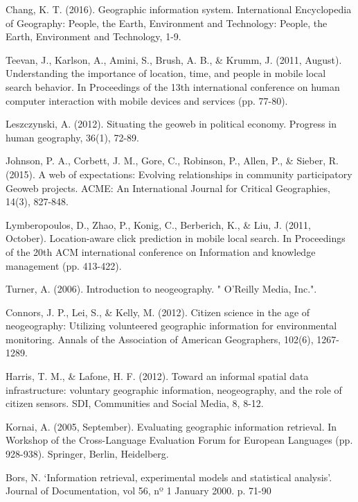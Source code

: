 \documentclass{llncs}
\begin{document}
%
%
\begin{thebibliography}{}
%
Chang, K. T. (2016). Geographic information system. International Encyclopedia
of Geography: People, the Earth, Environment and Technology: People, the Earth,
Environment and Technology, 1-9.

Teevan, J., Karlson, A., Amini, S., Brush, A. B., \& Krumm, J. (2011, August).
Understanding the importance of location, time, and people in mobile local
search behavior. In Proceedings of the 13th international conference on human
computer interaction with mobile devices and services (pp. 77-80).

Leszczynski, A. (2012). Situating the geoweb in political economy.
Progress in human geography, 36(1), 72-89.

Johnson, P. A., Corbett, J. M., Gore, C., Robinson, P., Allen, P., \& Sieber,
R. (2015). A web of expectations: Evolving relationships in community
participatory Geoweb projects. ACME: An International Journal for Critical
Geographies, 14(3), 827-848.

Lymberopoulos, D., Zhao, P., Konig, C., Berberich, K., \& Liu, J.
(2011, October). Location-aware click prediction in mobile local search. In
Proceedings of the 20th ACM international conference on Information and
knowledge management (pp. 413-422).

Turner, A. (2006). Introduction to neogeography. " O'Reilly Media, Inc.".

Connors, J. P., Lei, S., \& Kelly, M. (2012). Citizen science in the age of
neogeography: Utilizing volunteered geographic information for environmental
monitoring. Annals of the Association of American Geographers, 102(6),
1267-1289.

Harris, T. M., \& Lafone, H. F. (2012). Toward an informal spatial data
infrastructure: voluntary geographic information, neogeography, and the role
of citizen sensors. SDI, Communities and Social Media, 8, 8-12.

Kornai, A. (2005, September). Evaluating geographic information retrieval. In
Workshop of the Cross-Language Evaluation Forum for European Languages (pp.
928-938). Springer, Berlin, Heidelberg.

Bors, N. ‘Information retrieval, experimental models and
statistical analysis’. Journal of Documentation, vol 56, nº 1 January 2000. p.
71-90


\end{thebibliography}
\end{document}
